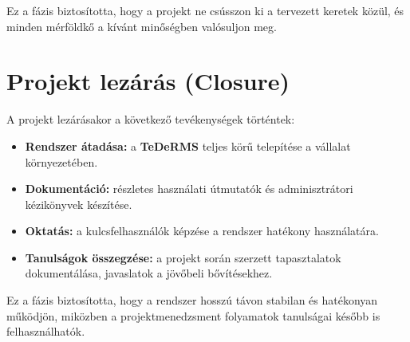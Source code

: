 Ez a fázis biztosította, hogy a projekt ne csússzon ki a tervezett keretek közül, és minden mérföldkő a kívánt minőségben valósuljon meg.

\section{Projekt lezárás (Closure)}

A projekt lezárásakor a következő tevékenységek történtek:
\begin{itemize}
    \item \textbf{Rendszer átadása:} a \textbf{TeDeRMS} teljes körű telepítése a vállalat környezetében.
    \item \textbf{Dokumentáció:} részletes használati útmutatók és adminisztrátori kézikönyvek készítése.
    \item \textbf{Oktatás:} a kulcsfelhasználók képzése a rendszer hatékony használatára.
    \item \textbf{Tanulságok összegzése:} a projekt során szerzett tapasztalatok dokumentálása, javaslatok a jövőbeli bővítésekhez.
\end{itemize}

Ez a fázis biztosította, hogy a rendszer hosszú távon stabilan és hatékonyan működjön, 
miközben a projektmenedzsment folyamatok tanulságai később is felhasználhatók.
